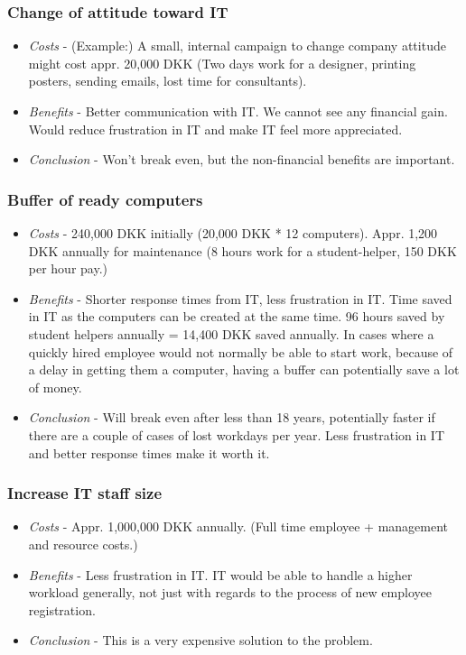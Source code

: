 \subsubsection{Change of attitude toward IT}
\begin{itemize}
\item \emph{Costs} - (Example:) A small, internal campaign to change company attitude might cost appr. 20,000 DKK (Two days work for a designer, printing posters, sending emails, lost time for consultants).
\item \emph{Benefits} - Better communication with IT. We cannot see any financial gain. Would reduce frustration in IT and make IT feel more appreciated.
\item \emph{Conclusion} - Won't break even, but the non-financial benefits are important.
\end{itemize}

\subsubsection{Buffer of ready computers}
\begin{itemize}
	\item \emph{Costs} - 240,000 DKK initially (20,000 DKK * 12 computers). Appr. 1,200 DKK annually for maintenance (8 hours work for a student-helper, 150 DKK per hour pay.)
	\item \emph{Benefits} - Shorter response times from IT, less frustration in IT. Time saved in IT as the computers can be created at the same time. 96 hours saved by student helpers annually = 14,400 DKK saved annually. In cases where a quickly hired employee would not normally be able to start work, because of a delay in getting them a computer, having a buffer can potentially save a lot of money.
	\item \emph{Conclusion} - Will break even after less than 18 years, potentially faster if there are a couple of cases of lost workdays per year. Less frustration in IT and better response times make it worth it.
\end{itemize}

\subsubsection{Increase IT staff size}
\begin{itemize}
	\item \emph{Costs} - Appr. 1,000,000 DKK annually. (Full time employee + management and resource costs.)
	\item \emph{Benefits} - Less frustration in IT. IT would be able to handle a higher workload generally, not just with regards to the process of new employee registration.
	\item \emph{Conclusion} - This is a very expensive solution to the problem. 
\end{itemize}

